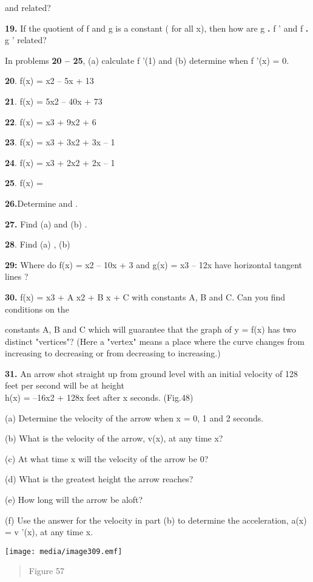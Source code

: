 and related?

\textbf{19.} If the quotient of f and g is a constant ( for all x), then
how are g \textbf{.} f ' and f \textbf{.} g ' related?

In problems \textbf{20 -- 25}, (a) calculate f '(1) and (b) determine
when f '(x) = 0.

\textbf{20}. f(x) = x2 -- 5x + 13

\textbf{21}. f(x) = 5x2 -- 40x + 73

\textbf{22}. f(x) = x3 + 9x2 + 6

\textbf{23}. f(x) = x3 + 3x2 + 3x -- 1

\textbf{24}. f(x) = x3 + 2x2 + 2x -- 1

\textbf{25}. f(x) =

\textbf{26.}Determine and .

\textbf{27.} Find (a) and (b) .

\textbf{28}. Find (a) , (b)

\textbf{29:} Where do f(x) = x2 -- 10x + 3 and g(x) = x3 -- 12x have
horizontal tangent lines ?

\textbf{30.} f(x) = x3 + A x2 + B x + C with constants A, B and C. Can
you find conditions on the

constants A, B and C which will guarantee that the graph of y = f(x) has
two distinct "vertices"? (Here a "vertex" means a place where the curve
changes from increasing to decreasing or from decreasing to increasing.)

\textbf{31.} An arrow shot straight up from ground level with an initial
velocity of 128 feet per second will be at height\\
h(x) = --16x2 + 128x feet after x seconds. (Fig.48)

(a) Determine the velocity of the arrow when x = 0, 1 and 2 seconds.

(b) What is the velocity of the arrow, v(x), at any time x?

(c) At what time x will the velocity of the arrow be 0?

(d) What is the greatest height the arrow reaches?

(e) How long will the arrow be aloft?

(f) Use the answer for the velocity in part (b) to determine the
acceleration, a(x) = v '(x), at any time x.

\texttt{[image: media/image309.emf]}

\begin{quote}
Figure 57
\end{quote}

